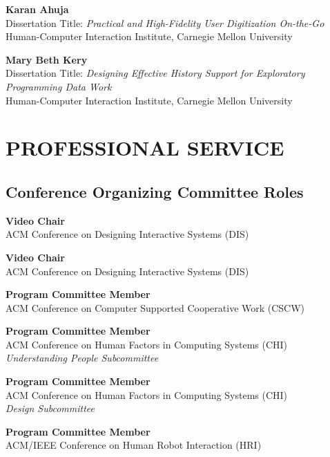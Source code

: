 \documentclass[11pt]{article} %
\begin{document}
 \textbf{Karan Ahuja}\\
Dissertation Title: \textit{Practical and High-Fidelity User Digitization On-the-Go}\\
Human-Computer Interaction Institute, Carnegie Mellon University
\medskip

 \textbf{Mary Beth Kery}\\
Dissertation Title: \textit{Designing Effective History Support for Exploratory Programming Data Work}\\
Human-Computer Interaction Institute, Carnegie Mellon University


\section*{\uppercase{Professional Service}}
\subsection*{Conference Organizing Committee Roles}
 \textbf{Video Chair}\\
ACM Conference on Designing Interactive Systems (DIS)
\medskip

 \textbf{Video Chair}\\
ACM Conference on Designing Interactive Systems (DIS)
\medskip

 \textbf{Program Committee Member }\\
ACM Conference on Computer Supported Cooperative Work (CSCW)
\medskip

 \textbf{Program Committee Member}\\
ACM Conference on Human Factors in Computing Systems (CHI)\\ 
\textit{Understanding People Subcommittee }
\medskip

 \textbf{Program Committee Member}\\
ACM Conference on Human Factors in Computing Systems (CHI)\\
\textit{Design Subcommittee }
\medskip

 \textbf{Program Committee Member}\\
ACM/IEEE Conference on Human Robot Interaction (HRI)
\medskip
\end{document}
